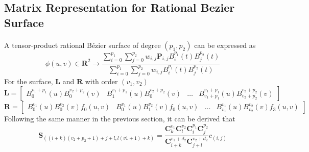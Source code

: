 \subsection{Matrix Representation for Rational Bezier Surface} 
\paragraph{}
A tensor-product rational Bézier surface of degree $(p_1,p_2)$ can be expressed as
\begin{equation*}
	\phi(u,v)\in\mathbf{R}^2 \rightarrow \frac{\sum_{i=0}^{p_1}\sum_{j=0}^{p_2}w_{i,j}\mathbf{P}_{i,j}B_i^{p_1}(t)B_j^{p_2}(t) }{\sum_{i=0}^{p_1}\sum_{j=0}^{p_2}w_{i,j}B_i^{p_1}(t)B_j^{p_2}(t)}
\end{equation*}
For the surface, $\mathbf{L}$ and $\mathbf{R}$ with order $(v_1,v_2)$
\begin{equation*}
	\mathbf{L} =
	\begin{bmatrix}
		B_0^{v_1+p_1}(u)B_0^{v_2+p_2}(v) & B_1^{v_1+p_1}(u)B_0^{v_2+p_2}(v) & \dots & B_{v_1+p_1}^{v_1+p_1}(u)B_{v_2+p_2}^{v_2+p_2}(v)
	\end{bmatrix}
\end{equation*}
\begin{equation*}
	\mathbf{R} =
	\begin{bmatrix}
		B_0^{v_1}(u)B_0^{v_2}(v)f_0(u,v) & B_0^{v_1}(u)B_1^{v_2}(v)f_0(u,v) & \dots & B_{v_1}^{v_1}(u)B_{v_2}^{v_2}(v)f_3(u,v)
	\end{bmatrix}
\end{equation*}
Following the same manner in the previous section, it can be derived that 
\begin{equation}
	\mathbf{S}_{\left( (i+k)(v_2+p_2+1)+j+l, l(v1+1)+k\right)} = 
	\frac{\mathbf{C}_k^{v_1}\mathbf{C}_l^{v_2}\mathbf{C}_i^{p_1}\mathbf{C}_j^{p_2}} 
		{\mathbf{C}_{i+k}^{v_1+d_2}\mathbf{C}_{j+l}^{v_2+d_2}}c_{(i,j)}
\end{equation}

